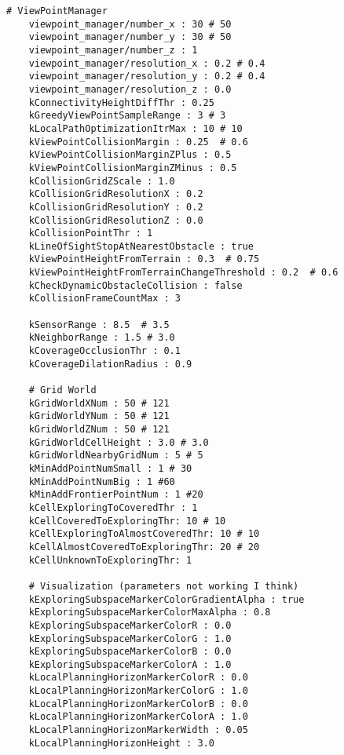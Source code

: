 \begin{lstlisting}[style=yaml, caption={TARE planner parameter configuration for Unitree GO2}, label={lst:tare_config}]
    # ViewPointManager
    viewpoint_manager/number_x : 30 # 50
    viewpoint_manager/number_y : 30 # 50
    viewpoint_manager/number_z : 1
    viewpoint_manager/resolution_x : 0.2 # 0.4
    viewpoint_manager/resolution_y : 0.2 # 0.4
    viewpoint_manager/resolution_z : 0.0
    kConnectivityHeightDiffThr : 0.25
    kGreedyViewPointSampleRange : 3 # 3
    kLocalPathOptimizationItrMax : 10 # 10
    kViewPointCollisionMargin : 0.25  # 0.6
    kViewPointCollisionMarginZPlus : 0.5
    kViewPointCollisionMarginZMinus : 0.5
    kCollisionGridZScale : 1.0
    kCollisionGridResolutionX : 0.2
    kCollisionGridResolutionY : 0.2
    kCollisionGridResolutionZ : 0.0
    kCollisionPointThr : 1
    kLineOfSightStopAtNearestObstacle : true
    kViewPointHeightFromTerrain : 0.3  # 0.75
    kViewPointHeightFromTerrainChangeThreshold : 0.2  # 0.6
    kCheckDynamicObstacleCollision : false
    kCollisionFrameCountMax : 3

    kSensorRange : 8.5  # 3.5
    kNeighborRange : 1.5 # 3.0
    kCoverageOcclusionThr : 0.1
    kCoverageDilationRadius : 0.9

    # Grid World
    kGridWorldXNum : 50 # 121
    kGridWorldYNum : 50 # 121
    kGridWorldZNum : 50 # 121
    kGridWorldCellHeight : 3.0 # 3.0
    kGridWorldNearbyGridNum : 5 # 5
    kMinAddPointNumSmall : 1 # 30
    kMinAddPointNumBig : 1 #60
    kMinAddFrontierPointNum : 1 #20
    kCellExploringToCoveredThr : 1
    kCellCoveredToExploringThr: 10 # 10
    kCellExploringToAlmostCoveredThr: 10 # 10
    kCellAlmostCoveredToExploringThr: 20 # 20
    kCellUnknownToExploringThr: 1

    # Visualization (parameters not working I think)
    kExploringSubspaceMarkerColorGradientAlpha : true
    kExploringSubspaceMarkerColorMaxAlpha : 0.8
    kExploringSubspaceMarkerColorR : 0.0
    kExploringSubspaceMarkerColorG : 1.0
    kExploringSubspaceMarkerColorB : 0.0
    kExploringSubspaceMarkerColorA : 1.0
    kLocalPlanningHorizonMarkerColorR : 0.0
    kLocalPlanningHorizonMarkerColorG : 1.0
    kLocalPlanningHorizonMarkerColorB : 0.0
    kLocalPlanningHorizonMarkerColorA : 1.0
    kLocalPlanningHorizonMarkerWidth : 0.05
    kLocalPlanningHorizonHeight : 3.0

\end{lstlisting}